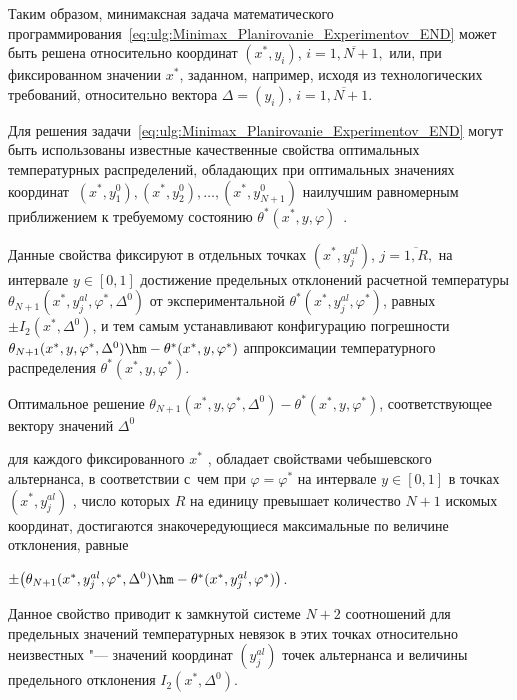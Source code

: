 Таким образом, минимаксная задача математического программирования~\eqref{eq:ulg:Minimax_Planirovanie_Experimentov_END} может быть решена относительно координат  $ (x^*,y_i)$, $i = \overline {1,N + 1} ,$ или, при фиксированном значении  $ x ^*  $, заданном, например, исходя из  технологических требований, относительно вектора  $\Delta= (y_i)$, $i = \overline {1,N+1} $. 



Для решения задачи~\eqref{eq:ulg:Minimax_Planirovanie_Experimentov_END} могут быть использованы известные качественные свойства оптимальных температурных распределений, обладающих при оптимальных значениях координат $  \ (x^*,y_1^0),(x^*,y_2^0), \ldots, (x^*,y_{N + 1}^0)  $  наилучшим равномерным приближением к требуемому состоянию $ {\theta ^*}(x^*,y,{\varphi })$~\cite{ulg:bib:Rapoport}. 

Данные свойства фиксируют в отдельных точках $ (x^*,y_j^{al})$, $j = \overline {1,R}, $  на интервале $ y \in [ 0,1 ] $  достижение предельных отклонений расчетной температуры $ \theta _{N + 1}( x^*,y_j^{al},\varphi ^*,\Delta ^0 ) $   от экспериментальной $ \theta ^*(x^*,y_j^{al},\varphi ^*) $, равных  $ \pm {I_2}(x^*,\Delta ^0) $, и тем самым устанавливают конфигурацию погрешности  $\theta _{N + 1}( x^*,y,\varphi ^*,\Delta ^0)  \hm - \theta ^*(x^*,y,\varphi ^*)$ аппроксимации температурного распределения  $\theta ^*(x^*,y,\varphi ^*)$.



Оптимальное решение  $ \theta _{N + 1}( x^*,y,\varphi ^*,\Delta ^0) - \theta ^*(x^*,y,\varphi ^*)$, соответствующее вектору значений  $ \Delta ^0$%

для каждого фиксированного  $x ^*$ , обладает свойствами чебышевского альтернанса, в соответствии с~чем при $\varphi  = \varphi ^*$  на интервале  ${y \in [ 0,1]}$ в точках  $(x^*,y_j^{al})$ , число которых $R$  на единицу превышает количество  $N + 1$  искомых координат, достигаются знакочередующиеся максимальные по величине отклонения, равные

$ \pm \bigl( \theta _{N + 1} ( x^*,y_j^{al}, \varphi ^*, \Delta ^0) \hm - \theta ^*(x^*,y_j^{al}, \varphi ^*) \bigr)$. 



Данное свойство приводит к замкнутой системе $N + 2$  соотношений для предельных значений температурных невязок в этих точках относительно неизвестных "--- значений координат  $(y_j^{al})$ точек альтернанса и величины предельного отклонения  ${I_2}( x^*,\Delta ^0 )$. 

